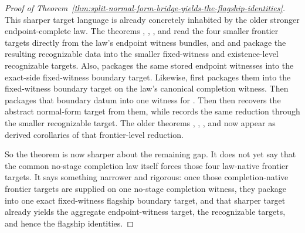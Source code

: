 \begin{proof}[Proof of Theorem~\ref{thm:split-normal-form-bridge-yields-the-flagship-identities}]
This sharper target language is already concretely inhabited by the older
stronger endpoint-complete law. The theorems
,
,
,
and
read the four smaller frontier targets directly from the law's endpoint
witness bundles, and
and
package the resulting recognizable data into the smaller fixed-witness and
existence-level recognizable targets. Also,
packages the same stored endpoint witnesses into the exact-side fixed-witness
boundary target. Likewise,
first packages them into the fixed-witness boundary target on the law's
canonical completion witness. Then
packages that boundary datum into one witness for
. Then
then recovers the abstract normal-form target from them, while
records the same reduction through the smaller recognizable target. The older theorems
,
,
,
and
now appear as derived corollaries of that frontier-level reduction.

So the theorem is now sharper about the remaining gap. It does not yet say
that the common no-stage completion law itself forces those four law-native
frontier targets. It says something narrower and rigorous: once those
completion-native frontier targets are supplied on one no-stage completion
witness, they package into one exact fixed-witness flagship boundary target,
and that sharper target already yields the aggregate endpoint-witness target,
the recognizable targets, and hence the flagship identities.
\end{proof}


